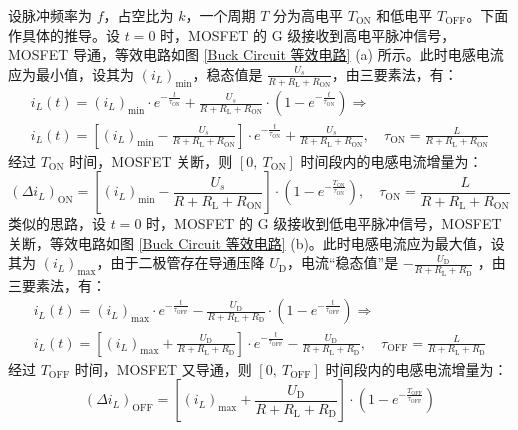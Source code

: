 \documentclass[UTF8]{article}
\theoremstyle{MyLineTheoremStyle} %
\theoremstyle{MyBlockTheoremStyle} %
\theoremstyle{MySubsubsectionStyle} %
\begin{document}
设脉冲频率为 $f$，占空比为 $k$，一个周期 $T$ 分为高电平 $T_{\text{ON}}$ 和低电平 $T_{\text{OFF}}$。下面作具体的推导。设 $t = 0$ 时，MOSFET 的 G 级接收到高电平脉冲信号，MOSFET 导通，等效电路如图 \ref{Buck Circuit 等效电路} (a) 所示。此时电感电流应为最小值，设其为 $\left(i_L\right)_{\min}$，稳态值是 $ \frac{U_s}{R + R_{\text{L}} + R_{\text{ON}}}$，由三要素法，有：
\begin{gather}
i_L(t) = \left(i_L\right)_{\min}\cdot e^{-\frac{t}{\tau_{\text{ON}}}} + \frac{U_s}{R + R_{\text{L}} + R_{\text{ON}}}\cdot\left(1 - e^{-\frac{t}{\tau_{\text{ON}}}}\right) \Longrightarrow \\ 
i_L(t) = \left[ \left(i_L\right)_{\min} - \frac{U_s}{R + R_{\text{L}} + R_{\text{ON}}} \right]\cdot e^{-\frac{t}{\tau_{\text{ON}}}} + \frac{U_s}{R + R_{\text{L}} + R_{\text{ON}}},\quad \tau_{\text{ON}} = \frac{L}{R + R_{\text{L}} + R_{\text{ON}}}
\end{gather}
经过 $T_{\text{ON}}$ 时间，MOSFET 关断，则 $[0,\  T_{\text{ON}}]$ 时间段内的电感电流增量为：
\begin{equation}
\left(\Delta i_L\right)_{\text{ON}} = \left[ \left(i_L\right)_{\min} - \frac{U_s}{R + R_{\text{L}} + R_{\text{ON}}} \right]\cdot \left(1 - e^{-\frac{T_{\text{ON}}}{\tau_{\text{ON}}}} \right) ,\quad
\tau_{\text{ON}} = \frac{L}{R + R_{\text{L}} + R_{\text{ON}}}
\end{equation}
类似的思路，设 $t = 0$ 时，MOSFET 的 G 级接收到低电平脉冲信号，MOSFET 关断，等效电路如图 \ref{Buck Circuit 等效电路} (b)。此时电感电流应为最大值，设其为 $\left(i_L\right)_{\max}$，由于二极管存在导通压降 $U_\text{D}$，电流“稳态值”是 $- \frac{U_\text{D}}{R + R_{\text{L}} + R_{\text{D}}}$ ，由三要素法，有：
\begin{gather}
    i_L(t) = \left(i_L\right)_{\max}\cdot e^{-\frac{t}{\tau_{\text{OFF}}}} - \frac{U_\text{D}}{R + R_{\text{L}} + R_{\text{D}}}\cdot\left(1 - e^{-\frac{t}{\tau_{\text{OFF}}}}\right) \Longrightarrow \\ 
    i_L(t) = \left[ \left(i_L\right)_{\max} + \frac{U_\text{D}}{R + R_{\text{L}} + R_{\text{D}}} \right]\cdot e^{-\frac{t}{\tau_{\text{OFF}}}} - \frac{U_\text{D}}{R + R_{\text{L}} + R_{\text{D}}},\quad \tau_{\text{OFF}} = \frac{L}{R + R_{\text{L}} + R_{\text{D}}}
\end{gather}
经过 $T_{\text{OFF}}$ 时间，MOSFET 又导通，则 $[0,\  T_{\text{OFF}}]$ 时间段内的电感电流增量为：
\begin{equation}
    \left(\Delta i_L\right)_{\text{OFF}} = \left[ \left(i_L\right)_{\max} + \frac{U_\text{D}}{R + R_{\text{L}} + R_{\text{D}}}\right]\cdot \left(1 - e^{-\frac{T_{\text{OFF}}}{\tau_{\text{OFF}}}} \right)
\end{equation}
\end{document}
